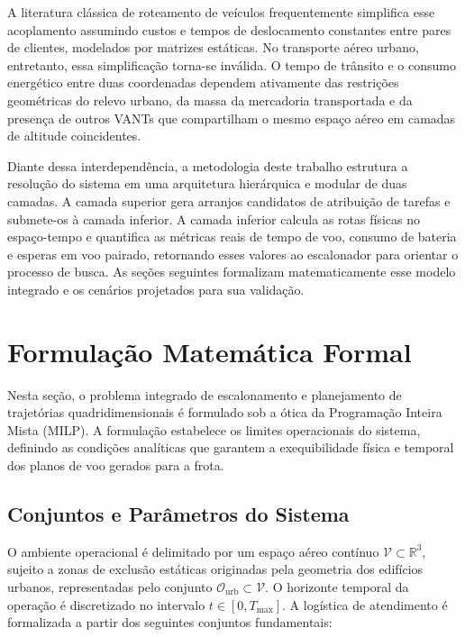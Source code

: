 A literatura clássica de roteamento de veículos frequentemente simplifica esse acoplamento assumindo custos e tempos de deslocamento constantes entre pares de clientes, modelados por matrizes estáticas. No transporte aéreo urbano, entretanto, essa simplificação torna-se inválida. O tempo de trânsito e o consumo energético entre duas coordenadas dependem ativamente das restrições geométricas do relevo urbano, da massa da mercadoria transportada e da presença de outros VANTs que compartilham o mesmo espaço aéreo em camadas de altitude coincidentes.

Diante dessa interdependência, a metodologia deste trabalho estrutura a resolução do sistema em uma arquitetura hierárquica e modular de duas camadas. A camada superior gera arranjos candidatos de atribuição de tarefas e submete-os à camada inferior. A camada inferior calcula as rotas físicas no espaço-tempo e quantifica as métricas reais de tempo de voo, consumo de bateria e esperas em voo pairado, retornando esses valores ao escalonador para orientar o processo de busca. As seções seguintes formalizam matematicamente esse modelo integrado e os cenários projetados para sua validação.

\section{Formulação Matemática Formal}\label{sec:formulacao_matematica}

Nesta seção, o problema integrado de escalonamento e planejamento de trajetórias quadridimensionais é formulado sob a ótica da Programação Inteira Mista (MILP). A formulação estabelece os limites operacionais do sistema, definindo as condições analíticas que garantem a exequibilidade física e temporal dos planos de voo gerados para a frota.

\subsection{Conjuntos e Parâmetros do Sistema}

O ambiente operacional é delimitado por um espaço aéreo contínuo $\mathcal{V} \subset \mathbb{R}^3$, sujeito a zonas de exclusão estáticas originadas pela geometria dos edifícios urbanos, representadas pelo conjunto $\mathcal{O}_{\text{urb}} \subset \mathcal{V}$. O horizonte temporal da operação é discretizado no intervalo $t \in [0, T_{\text{max}}]$. A logística de atendimento é formalizada a partir dos seguintes conjuntos fundamentais:

